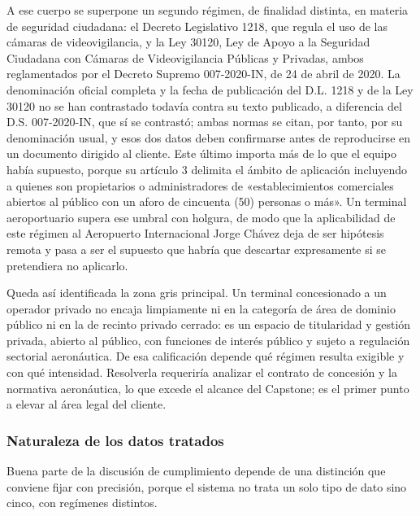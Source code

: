 A ese cuerpo se superpone un segundo régimen, de finalidad distinta, en
materia de seguridad ciudadana: el Decreto Legislativo 1218, que regula
el uso de las cámaras de videovigilancia, y la Ley 30120, Ley de Apoyo a
la Seguridad Ciudadana con Cámaras de Videovigilancia Públicas y
Privadas, ambos reglamentados por el Decreto Supremo 007-2020-IN, de 24
de abril de 2020. La denominación oficial completa y la fecha de
publicación del D.L. 1218 y de la Ley 30120 no se han contrastado
todavía contra su texto publicado, a diferencia del D.S. 007-2020-IN,
que sí se contrastó; ambas normas se citan, por tanto, por su
denominación usual, y esos dos datos deben confirmarse antes de
reproducirse en un documento dirigido al cliente. Este último importa
más de lo que el equipo había supuesto, porque su artículo 3 delimita el
ámbito de aplicación incluyendo a quienes son propietarios o
administradores de «establecimientos comerciales abiertos al público con
un aforo de cincuenta (50) personas o más». Un terminal aeroportuario
supera ese umbral con holgura, de modo que la aplicabilidad de este
régimen al Aeropuerto Internacional Jorge Chávez deja de ser hipótesis
remota y pasa a ser el supuesto que habría que descartar expresamente si
se pretendiera no aplicarlo. 

Queda así identificada la zona gris principal. Un terminal concesionado
a un operador privado no encaja limpiamente ni en la categoría de área
de dominio público ni en la de recinto privado cerrado: es un espacio de
titularidad y gestión privada, abierto al público, con funciones de
interés público y sujeto a regulación sectorial aeronáutica. De esa
calificación depende qué régimen resulta exigible y con qué intensidad.
Resolverla requeriría analizar el contrato de concesión y la normativa
aeronáutica, lo que excede el alcance del Capstone; es el primer punto a
elevar al área legal del cliente.

\subsubsection{Naturaleza de los datos tratados}

Buena parte de la discusión de cumplimiento depende de una distinción
que conviene fijar con precisión, porque el sistema no trata un solo
tipo de dato sino cinco, con regímenes distintos.

